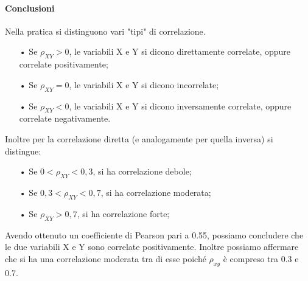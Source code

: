 \documentclass[a4paper,12pt,titlepage,oneside,openany]{book}
\begin{document}
\paragraph*{Conclusioni}
Nella pratica si distinguono vari "tipi" di correlazione.
\begin{itemize}
	\item[•] Se 
	\begin{math}
		\rho_{XY}>0
	\end{math}, le variabili X e Y si dicono direttamente correlate, oppure correlate positivamente;
	\item[•] Se 
	\begin{math}
		\rho_{XY}=0
	\end{math}, le variabili X e Y si dicono incorrelate;
		\item[•] Se 
	\begin{math}
		\rho_{XY}<0
	\end{math}, le variabili X e Y si dicono inversamente correlate, oppure correlate negativamente.
\end{itemize}
Inoltre per la correlazione diretta (e analogamente per quella inversa) si distingue:
\begin{itemize}
	\item[•] Se 
	\begin{math}
		0<\rho_{XY}<0,3
	\end{math}, si ha correlazione debole;
	\item[•] Se 
	\begin{math}
		0,3<\rho_{XY}<0,7
	\end{math}, si ha correlazione moderata;
	\item[•] Se 
	\begin{math}
		\rho_{XY}>0,7
	\end{math}, si ha correlazione forte;
\end{itemize}
Avendo ottenuto un coefficiente di Pearson pari a 0.55, possiamo concludere che le due variabili X e Y sono correlate positivamente.
Inoltre possiamo affermare che si ha una correlazione moderata tra di esse poiché 
\begin{math}
	\rho_{xy}
\end{math} 
è compreso tra 0.3 e 0.7.
\end{document}
